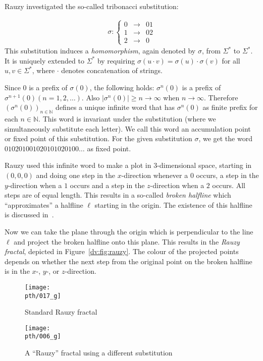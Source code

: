 \documentclass[oribibl]{lncs/llncs}
\begin{document}
Rauzy investigated the so-called tribonacci substitution:

\begin{eqnarray*}
\sigma: \left\{ \begin{array}{lll}
0 &\rightarrow& 01\\
1 &\rightarrow& 02\\
2 &\rightarrow& 0
\end{array} \right.
\end{eqnarray*}
This substitution induces a \emph{homomorphism}, again denoted by $\sigma$,
from $\Sigma^*$ to $\Sigma^*$. It is uniquely extended to $\Sigma^*$ by
requiring $\sigma(u \cdot v) = \sigma(u) \cdot \sigma(v)$ for all $u, v \in
\Sigma^*$, where $\cdot$ denotes concatenation of strings.

Since $0$ is a prefix of $\sigma(0)$, the following holds: $\sigma^n(0)$ is a
prefix of $\sigma^{n + 1}(0) (n = 1, 2, \ldots)$. Also $|\sigma^n(0)| \ge n
\rightarrow \infty$ when $n \rightarrow \infty$. Therefore $(\sigma^n(0))_{n
\in \mathbb{N}}$ defines a unique infinite word that has $\sigma^n(0)$ as
finite prefix for each $n \in \mathbb{N}$. This word is invariant under the
substitution (where we simultaneously substitute each letter). We call this
word an accumulation point or fixed point of this substitution. For the given
substitution $\sigma$, we get the word $010201001020101020100\ldots$ as fixed
point.

Rauzy used this infinite word to make a plot in
3-dimensional space, starting in $(0, 0, 0)$ and doing one step in the
$x$-direction whenever a $0$ occurs, a step in the $y$-direction when a $1$
occurs and a step in the $z$-direction when a $2$ occurs. All steps are of
equal length. This results in a so-called \emph{broken halfline} which
``approximates'' a halfline $\ell$ starting in the origin. The existence of
this halfline is discussed in~\cite{Rau}.

Now we can take the plane through the origin which is perpendicular to the line
$\ell$ and project the broken halfline onto this plane. This results in the
\emph{Rauzy fractal}, depicted in Figure~\ref{dv:fig:rauzy}. The colour
of the projected points depends on whether the next step from the original
point on the broken halfline is in the $x$-, $y$-, or $z$-direction. 

\begin{figure}
\hspace{.25cm}
\begin{minipage}[t]{.45\textwidth}
\begin{center}
\texttt{[image: \\pth/017\_g]}
\end{center}
\caption{Standard Rauzy fractal} \label{dv:fig:rauzy}
\end{minipage}
\hfill
\begin{minipage}[t]{.45\textwidth}
\begin{center}
\texttt{[image: \\pth/006\_g]}
\end{center}
\caption{A ``Rauzy'' fractal using a different substitution} 
\label{dv:fig:rauzy2}
\end{minipage}
\hspace{.25cm}
\end{figure}
\end{document}
